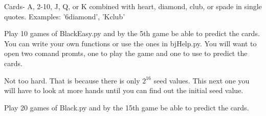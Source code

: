 Cards- A, 2-10, J, Q, or K combined with heart, diamond, club, or spade in single quotes. Examples: '6diamond', 'Kclub'



\begin{problem}
Play 10 games of BlackEasy.py and by the 5th game be able to predict the cards. You can write your own functions or use the ones in bjHelp.py. You will want to open two comand promts, one to play the game and one to use to predict the cards. 
\end{problem}

Not too hard. That is because there is only $2^{16}$ seed values. This next one you will have to look at more hands until you can find out the initial seed value.

\begin{problem}
Play 20 games of Black.py and by the 15th game be able to predict the cards.
\end{problem}



